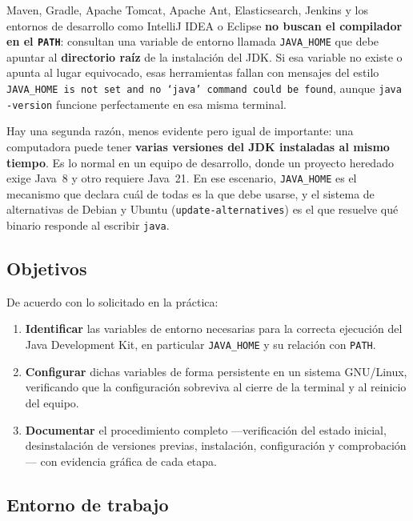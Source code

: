 Maven, Gradle, Apache Tomcat, Apache Ant, Elasticsearch, Jenkins y los entornos de
desarrollo como IntelliJ IDEA o Eclipse \textbf{no buscan el compilador en el
\texttt{PATH}}: consultan una variable de entorno llamada \texttt{JAVA\_HOME} que debe
apuntar al \textbf{directorio raíz} de la instalación del JDK. Si esa variable no
existe o apunta al lugar equivocado, esas herramientas fallan con mensajes del estilo
\texttt{JAVA\_HOME is not set and no `java' command could be found}, aunque
\texttt{java -version} funcione perfectamente en esa misma terminal.

Hay una segunda razón, menos evidente pero igual de importante: una computadora puede
tener \textbf{varias versiones del JDK instaladas al mismo tiempo}. Es lo normal en un
equipo de desarrollo, donde un proyecto heredado exige Java~8 y otro requiere Java~21.
En ese escenario, \texttt{JAVA\_HOME} es el mecanismo que declara cuál de todas es la
que debe usarse, y el sistema de alternativas de Debian y Ubuntu
(\texttt{update-alternatives}) es el que resuelve qué binario responde al escribir
\texttt{java}.

\subsection{Objetivos}

De acuerdo con lo solicitado en la práctica:

\begin{enumerate}
	\item \textbf{Identificar} las variables de entorno necesarias para la correcta
	ejecución del Java Development Kit, en particular \texttt{JAVA\_HOME} y su relación
	con \texttt{PATH}.
	\item \textbf{Configurar} dichas variables de forma persistente en un sistema
	GNU/Linux, verificando que la configuración sobreviva al cierre de la terminal y al
	reinicio del equipo.
	\item \textbf{Documentar} el procedimiento completo —verificación del estado
	inicial, desinstalación de versiones previas, instalación, configuración y
	comprobación— con evidencia gráfica de cada etapa.
\end{enumerate}

\subsection{Entorno de trabajo}

\footnotesize
\renewcommand{\arraystretch}{1.15}
\setlength{\tabcolsep}{4pt}

